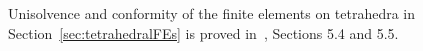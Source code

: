 \begin{remark}
  Unisolvence and conformity of the finite elements on tetrahedra in
  Section~\ref{sec:tetrahedralFEs}
  is proved in~\cite{monk}, Sections 5.4 and 5.5.
\end{remark}
